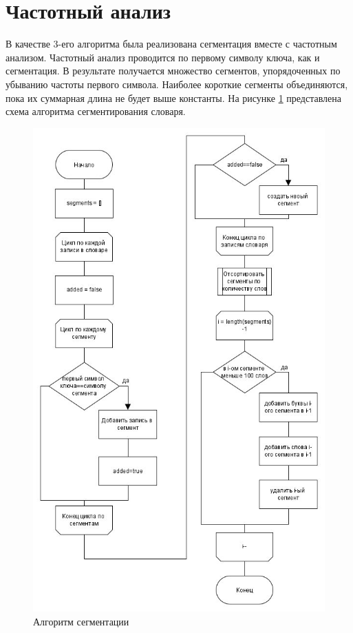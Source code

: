 \section{Частотный анализ}
\label{sec:freq}
В качестве 3-его алгоритма была реализована сегментация вместе с частотным анализом. Частотный анализ проводится по первому символу ключа, как и сегментация. В результате получается множество сегментов, упорядоченных по убыванию частоты первого символа. Наиболее короткие сегменты объединяются, пока их суммарная длина не будет выше константы. На рисунке \ref{fig:segmentation} представлена схема алгоритма сегментирования словаря.
\begin{figure}[H]
	\centering
	\includegraphics[height=0.8\textheight]{src/segmentation}
	\caption{Алгоритм сегментации}
	\label{fig:segmentation}
\end{figure}
